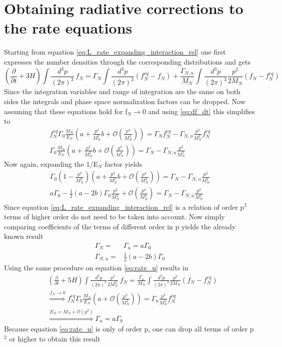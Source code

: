 \section{Obtaining radiative corrections to the rate equations}
\label{ap:rad_corrections}
Starting from equation \ref{eq:L_rate_expanding_interaction_rel} one first expresses the number densities through the corresponding distributions and gets
\begin{equation*}
	\left(\frac{\partial}{\partial t}+3H\right)\int\frac{d^3p}{\left(2\pi\right)^3}\:f_N=\Gamma_N\int\frac{d^3p}{\left(2\pi\right)^3}\left(f_N^{eq}-f_N\right)+\frac{\Gamma_{N,u}}{M_N}\int\frac{d^3p}{\left(2\pi\right)^3}\frac{p^2}{2M_N}\left(f_N-f_N^{eq}\right)
\end{equation*}
Since the integration variables and range of integration are the same on both sides the integrals and phase space normalization factors can be dropped. Now assuming that these equations hold for f$_N\rightarrow0$ and using \ref{eq:df_dt} this simplifies to 
\begin{align*}
	f_N^{eq}\Gamma_0\frac{M_N}{E_N}\left(a+\frac{p^2}{M_N^2}b+\mathcal{O}\left(\frac{p^4}{M_N^4}\right)\right)=\Gamma_Nf_N^{eq}-\Gamma_{N,u}\frac{p^2}{M_N^2}f_N^{eq}\\
	\Gamma_0\frac{M_N}{E_N}\left(a+\frac{p^2}{M_N^2}b+\mathcal{O}\left(\frac{p^4}{M_N^4}\right)\right)=\Gamma_N-\Gamma_{N,u}\frac{p^2}{M_N^2}
\end{align*}
Now again, expanding the 1/E$_N$ factor yields
\begin{align*}
	\Gamma_0\left(1-\frac{p^2}{M_N^2}\right)\left(a+\frac{p^2}{M_N^2}b+\mathcal{O}\left(\frac{p^4}{M_N^4}\right)\right)=\Gamma_N-\Gamma_{N,u}\frac{p^2}{M_N^2}\\
	a\Gamma_0-\frac{1}{2}(a-2b)\Gamma_0\frac{p^2}{M_N^2}+\mathcal{O}\left(\frac{p^4}{M_N^4}\right)=\Gamma_N-\Gamma_{N,u}\frac{p^2}{M_N^2}
\end{align*}
Since equation \ref{eq:L_rate_expanding_interaction_rel} is a relation of order p$^2$ terms of higher order do not need to be taken into account. \newline
Now simply comparing coefficients of the terms of different order in p yields the already known result
\begin{align*}
\Gamma_N=&\Gamma_u=a\Gamma_0\\
\Gamma_{N,u}=&\frac{1}{2}(a-2b)\Gamma_0
\end{align*}
Using the same procedure on equation \ref{eq:rate_u} results in 
\begin{align*}
&\left(\frac{\partial}{\partial t}+5H\right)\int\frac{d^3p}{\left(2\pi\right)^3}\frac{p^2}{2M_N^2}\:f_N=\frac{\Gamma_{u}}{M_N}\int\frac{d^3p}{\left(2\pi\right)^3}\frac{p^2}{2M_N}\left(f_N-f_N^{eq}\right)\\
&\overset{f_N\rightarrow0}{\Longrightarrow}f_N^{eq}\Gamma_0\frac{M_N}{E_N}\left(a+\mathcal{O}\left(\frac{p^2}{M_N^2}\right)\right)=\Gamma_{u}\frac{p^2}{M_N^2}f_N^{eq}\\
&\overset{E_N=M_N+\mathcal{O}(p^2)}{\Longrightarrow}\Gamma_u=a\Gamma_0
\end{align*}
Because equation \ref{eq:rate_u} is only of order p, one can drop all terms of order p$^2$ or higher to obtain this result